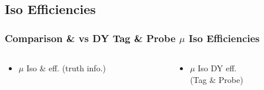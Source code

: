 \documentclass{beamer}
\begin{document}
\subsection{Iso Efficiencies}

\begin{frame}
 \frametitle{Comparison \ttbar \& \wpj vs DY Tag \& Probe $\mu$ Iso Efficiencies}
   \begin{columns}

   \begin{column}{0.33\textwidth}
     \begin{itemize}
   \item $\mu$ Iso \ttbar \& \wpj eff. (truth info.)
  \end{itemize}
   \end{column}
   \begin{column}{0.33\textwidth}
   \begin{itemize}
    \item $\mu$ Iso DY eff. \\(Tag \& Probe)
   \end{itemize}


\end{column}
\end{columns}
\end{frame}
\end{document}
